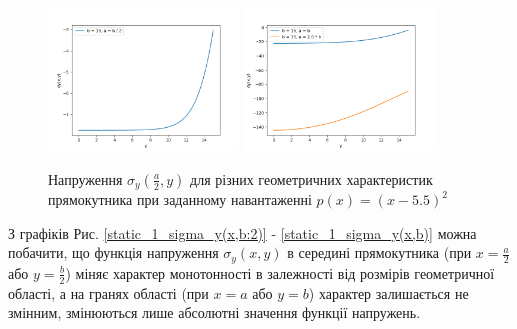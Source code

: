 \begin{figure}[H]
    \begin{center}
        \includegraphics[width=0.45\textwidth, scale=1]{images/results/static_1/sigma_y(a:2,y)1.png}
        \includegraphics[width=0.45\textwidth, scale=1]{images/results/static_1/sigma_y(a:2,y)2.png}
        \caption{Напруження $\sigma_y(\frac{a}{2}, y)$ для різних геометричних характеристик прямокутника при заданному навантаженні $p(x) = (x - 5.5)^2$}\label{static_1_sigma_y(a:2,y)}
    \end{center}
\end{figure}


З графіків Рис. \ref{static_1_sigma_y(x,b:2)} - \ref{static_1_sigma_y(x,b)} можна побачити,
що функція напруження $\sigma_y(x, y)$ в середині прямокутника (при $x=\frac{a}{2}$ або $y=\frac{b}{2}$)
міняє характер монотонності в залежності від розмірів геометричної області, а на гранях області (при $x=a$ або $y=b$)
характер залишається не змінним, змінюються лише абсолютні значення функції напружень.

